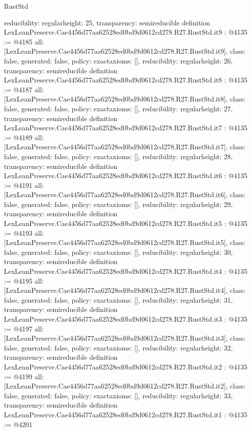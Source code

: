 \begin{lexlean}{RustStd}
\begin{coremodule}
{  reducibility: regular{height: 25},
  transparency: semireducible
}
definition LexLeanPreserve.Cae4456d77aa62528ed0bd9d0612cd278.R27.RustStd.it9 : @4135 := @4185 {
  all: [LexLeanPreserve.Cae4456d77aa62528ed0bd9d0612cd278.R27.RustStd.it9],
  class: false,
  generated: false,
  policy: exact{axioms: []},
  reducibility: regular{height: 26},
  transparency: semireducible
}
definition LexLeanPreserve.Cae4456d77aa62528ed0bd9d0612cd278.R27.RustStd.it8 : @4135 := @4187 {
  all: [LexLeanPreserve.Cae4456d77aa62528ed0bd9d0612cd278.R27.RustStd.it8],
  class: false,
  generated: false,
  policy: exact{axioms: []},
  reducibility: regular{height: 27},
  transparency: semireducible
}
definition LexLeanPreserve.Cae4456d77aa62528ed0bd9d0612cd278.R27.RustStd.it7 : @4135 := @4189 {
  all: [LexLeanPreserve.Cae4456d77aa62528ed0bd9d0612cd278.R27.RustStd.it7],
  class: false,
  generated: false,
  policy: exact{axioms: []},
  reducibility: regular{height: 28},
  transparency: semireducible
}
definition LexLeanPreserve.Cae4456d77aa62528ed0bd9d0612cd278.R27.RustStd.it6 : @4135 := @4191 {
  all: [LexLeanPreserve.Cae4456d77aa62528ed0bd9d0612cd278.R27.RustStd.it6],
  class: false,
  generated: false,
  policy: exact{axioms: []},
  reducibility: regular{height: 29},
  transparency: semireducible
}
definition LexLeanPreserve.Cae4456d77aa62528ed0bd9d0612cd278.R27.RustStd.it5 : @4135 := @4193 {
  all: [LexLeanPreserve.Cae4456d77aa62528ed0bd9d0612cd278.R27.RustStd.it5],
  class: false,
  generated: false,
  policy: exact{axioms: []},
  reducibility: regular{height: 30},
  transparency: semireducible
}
definition LexLeanPreserve.Cae4456d77aa62528ed0bd9d0612cd278.R27.RustStd.it4 : @4135 := @4195 {
  all: [LexLeanPreserve.Cae4456d77aa62528ed0bd9d0612cd278.R27.RustStd.it4],
  class: false,
  generated: false,
  policy: exact{axioms: []},
  reducibility: regular{height: 31},
  transparency: semireducible
}
definition LexLeanPreserve.Cae4456d77aa62528ed0bd9d0612cd278.R27.RustStd.it3 : @4135 := @4197 {
  all: [LexLeanPreserve.Cae4456d77aa62528ed0bd9d0612cd278.R27.RustStd.it3],
  class: false,
  generated: false,
  policy: exact{axioms: []},
  reducibility: regular{height: 32},
  transparency: semireducible
}
definition LexLeanPreserve.Cae4456d77aa62528ed0bd9d0612cd278.R27.RustStd.it2 : @4135 := @4199 {
  all: [LexLeanPreserve.Cae4456d77aa62528ed0bd9d0612cd278.R27.RustStd.it2],
  class: false,
  generated: false,
  policy: exact{axioms: []},
  reducibility: regular{height: 33},
  transparency: semireducible
}
definition LexLeanPreserve.Cae4456d77aa62528ed0bd9d0612cd278.R27.RustStd.it1 : @4135 := @4201 {
}
\end{coremodule}
\end{lexlean}

